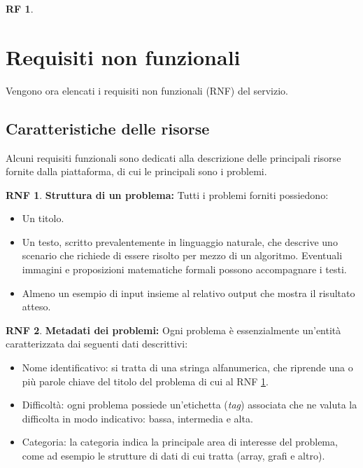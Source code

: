 \documentclass[11pt, a4paper]{article}
\theoremstyle{definition}
\newtheorem{funcreq}{RF} %
\newtheorem{nonfuncreq}{RNF} %
\begin{document}
\begin{funcreq}
\end{funcreq}


\newpage
\section{Requisiti non funzionali}
Vengono ora elencati i requisiti non funzionali (RNF) del servizio.

\subsection{Caratteristiche delle risorse}
Alcuni requisiti funzionali sono dedicati alla descrizione delle principali
risorse fornite dalla piattaforma, di cui le principali sono i problemi.

\begin{nonfuncreq}
\label{formatoproblema}
\textbf{Struttura di un problema:}
Tutti i problemi forniti possiedono:
\begin{itemize}
    \item Un titolo.

    \item Un testo, scritto prevalentemente in linguaggio naturale,
    che descrive uno scenario che richiede di essere risolto per mezzo
    di un algoritmo. Eventuali immagini e proposizioni matematiche
    formali possono accompagnare i testi.

    \item Almeno un esempio di input insieme al relativo output che
    mostra il risultato atteso.
\end{itemize}
\end{nonfuncreq}

\begin{nonfuncreq}
\label{metadata}
\textbf{Metadati dei problemi:} Ogni problema è essenzialmente un'entità
caratterizzata dai seguenti dati descrittivi:
\begin{itemize}
    \item Nome identificativo: si tratta di una stringa alfanumerica, che
    riprende una o più parole chiave del titolo del problema di cui al
    RNF \ref{formatoproblema}.
    
    \item Difficoltà: ogni problema possiede un'etichetta (\textit{tag})
    associata che ne valuta la difficolta in modo indicativo: bassa,
    intermedia e alta.

    \item Categoria: la categoria indica la principale area di interesse
    del problema, come ad esempio le strutture di dati di cui tratta
    (array, grafi e altro).
\end{itemize}
\end{nonfuncreq}
\end{document}
